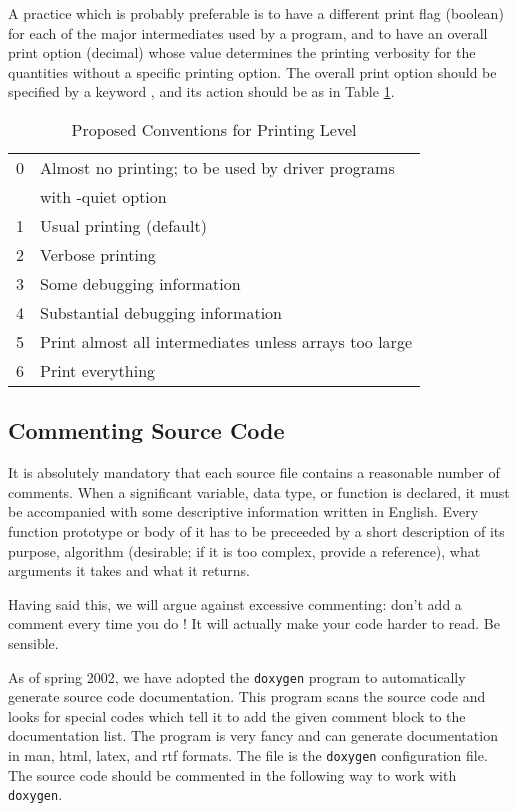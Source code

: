 A practice which is probably preferable is to have a different print
flag (boolean) for each of the major intermediates used by a program,
and to have an overall print option (decimal) whose value determines
the printing verbosity for the quantities without a specific printing
option.  The overall print option should be specified by a keyword
, and its action should be as in Table
\ref{tbl:iprint}.

\begin{table}
\caption{Proposed Conventions for Printing Level}
\label{tbl:iprint}
\begin{center}
\begin{tabular}{ll}
\hline \hline
0 & Almost no printing; to be used by driver programs \\
  & with -quiet option \\
1 & Usual printing (default) \\
2 & Verbose printing \\
3 & Some debugging information \\
4 & Substantial debugging information \\
5 & Print almost all intermediates unless arrays too large \\
6 & Print everything \\
\hline \hline
\end{tabular}
\end{center}
\end{table}

\subsection{Commenting Source Code}
It is absolutely mandatory that each source file contains a reasonable
number of comments. When a significant variable, data type, or
function is declared, it must be accompanied with some descriptive
information written in English.  Every function prototype or body of
it has to be preceeded by a short description of its purpose,
algorithm (desirable; if it is too complex, provide a reference), what
arguments it takes and what it returns.

Having said this, we will argue against excessive commenting: don't
add a comment every time you do !  It will actually make
your code harder to read.  Be sensible.

As of spring 2002, we have adopted the {\tt doxygen} program to
automatically generate source code documentation.  This program scans
the source code and looks for special codes which tell it to add the
given comment block to the documentation list.  The program is very
fancy and can generate documentation in man, html, latex, and rtf
formats.  The file  is the {\tt doxygen} configuration
file.  The source code should be commented in the following way to
work with {\tt doxygen}.

